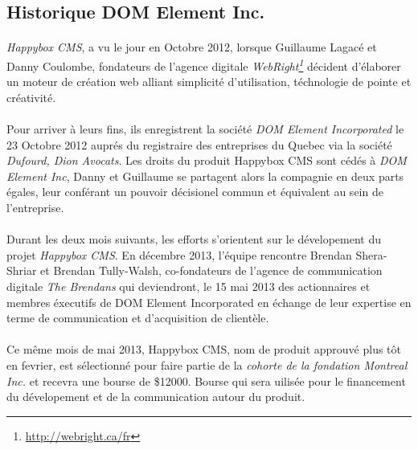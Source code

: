 \documentclass[11pt, a4paper ]{article}
\begin{document}
\begin{spacing}{1.5}
		\subsection{Historique DOM Element Inc.}

\paragraph{}
\emph{Happybox CMS}, a vu le jour en Octobre 2012, lorsque Guillaume Lagacé et Danny Coulombe, fondateurs de l'agence digitale \emph{WebRight\footnote{\url{http://webright.ca/fr}}} décident d'élaborer un moteur de création web alliant simplicité d'utilisation, téchnologie de pointe et créativité.

\paragraph{}
Pour arriver à leurs fins, ils enregistrent la société \emph{DOM Element Incorporated} le 23 Octobre 2012 auprés du registraire des entreprises du Quebec via la société \emph{Dufourd, Dion Avocats}. Les droits du produit Happybox CMS sont cédés à \emph{DOM Element Inc}, Danny et Guillaume se partagent alors la compagnie en deux parts égales, leur conférant un pouvoir décisionel commun et équivalent au sein de l'entreprise.

\paragraph{}
Durant les deux mois suivants, les efforts s'orientent sur le dévelopement du projet \emph{Happybox CMS}.
En décembre 2013, l'équipe rencontre Brendan Shera-Shriar et Brendan Tully-Walsh, co-fondateurs de l'agence de communication digitale \emph{The Brendans} qui deviendront, le 15 mai 2013 des actionnaires et membres éxecutifs de DOM Element Incorporated en échange de leur expertise en terme de communication et d'acquisition de clientèle.


\paragraph{}
Ce même mois de mai 2013, Happybox CMS, nom de produit approuvé plus tôt en fevrier, est sélectionné pour faire partie de la \emph{cohorte de la fondation Montreal Inc.} et recevra une bourse de \$12000. Bourse qui sera uilisée pour le financement du dévelopement et de la communication autour du produit.


\end{spacing}
\end{document}
